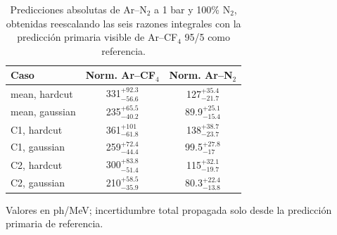 \begin{table}[htbp]
\centering
\caption{Predicciones absolutas de Ar--N$_2$ a 1 bar y 100\% N$_2$, obtenidas reescalando las seis razones integrales con la predicción primaria visible de Ar--CF$_4$ 95/5 como referencia.}
\label{tab:arn2_six_cases_from_integrals_primary_norms}
\begin{tabular}{lcc}
\toprule
Caso & Norm. Ar--CF$_4$ & Norm. Ar--N$_2$ \\
\midrule
mean, hardcut & \num{331}$^{+\num{92.3}}_{-\num{56.6}}$ & \num{127}$^{+\num{35.4}}_{-\num{21.7}}$ \\
mean, gaussian & \num{235}$^{+\num{65.5}}_{-\num{40.2}}$ & \num{89.9}$^{+\num{25.1}}_{-\num{15.4}}$ \\
C1, hardcut & \num{361}$^{+\num{101}}_{-\num{61.8}}$ & \num{138}$^{+\num{38.7}}_{-\num{23.7}}$ \\
C1, gaussian & \num{259}$^{+\num{72.4}}_{-\num{44.4}}$ & \num{99.5}$^{+\num{27.8}}_{-\num{17}}$ \\
C2, hardcut & \num{300}$^{+\num{83.8}}_{-\num{51.4}}$ & \num{115}$^{+\num{32.1}}_{-\num{19.7}}$ \\
C2, gaussian & \num{210}$^{+\num{58.5}}_{-\num{35.9}}$ & \num{80.3}$^{+\num{22.4}}_{-\num{13.8}}$ \\
\bottomrule
\end{tabular}
\par\vspace{0.35em}\footnotesize{Valores en ph/MeV; incertidumbre total propagada solo desde la predicción primaria de referencia.}
\end{table}

